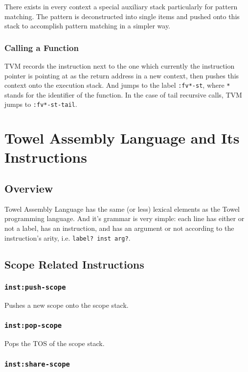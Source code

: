 \documentclass{article}
\newcommand{\inst}[1] {\texttt{inst:#1}}
\begin{document}
There exists in every context a special auxiliary stack particularly for pattern matching. The pattern is deconstructed into single items and pushed onto this stack to accomplish pattern matching in a simpler way.

\subsubsection{Calling a Function}

TVM records the instruction next to the one which currently the instruction pointer is pointing at as the return address in a new context, then pushes this context onto the execution stack. And jumps to the label \texttt{:fv*-st}, where \texttt{*} stands for the identifier of the function. In the case of tail recursive calls, TVM jumps to \texttt{:fv*-st-tail}.

\section{Towel Assembly Language and Its Instructions}

\subsection{Overview}

Towel Assembly Language has the same (or less) lexical elements as the Towel programming language. And it's grammar is very simple: each line has either or not a label, has an instruction, and has an argument or not according to the instruction's arity, i.e. \texttt{label? inst arg?}.

\subsection{Scope Related Instructions}

\subsubsection{\inst{push-scope}}

Pushes a new scope onto the scope stack.

\subsubsection{\inst{pop-scope}}

Pops the TOS of the scope stack.

\subsubsection{\inst{share-scope}}
\end{document}
